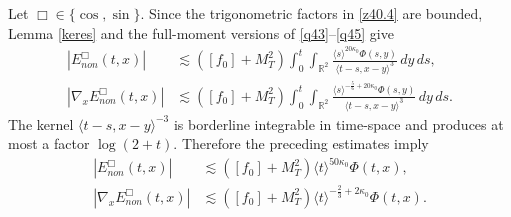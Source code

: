 \documentclass[reqno,11pt]{amsart}
\numberwithin{equation}{section}
\begin{document}
Let $\Box\in\{\cos,\sin\}$. Since the trigonometric factors in
\eqref{z40.4} are bounded, Lemma \ref{keres} and the full-moment versions
of \eqref{q43}--\eqref{q45} give
\begin{align*}
|E^\Box_{non}(t,x)|
&\lesssim([f_0]+M_T^2)
\int_0^t\!\!\int_{\mathbb R^2}
\frac{\langle s\rangle^{20\kappa_0}\Phi(s,y)}
{\langle t-s,x-y\rangle^3}\,dy\,ds,\\
|\nabla_xE^\Box_{non}(t,x)|
&\lesssim([f_0]+M_T^2)
\int_0^t\!\!\int_{\mathbb R^2}
\frac{\langle s\rangle^{-\frac56+20\kappa_0}\Phi(s,y)}
{\langle t-s,x-y\rangle^3}\,dy\,ds.
\end{align*}
The kernel $\langle t-s,x-y\rangle^{-3}$ is borderline integrable in
time-space and produces at most a factor $\log(2+t)$. Therefore the
preceding estimates imply
\begin{align}
|E^\Box_{non}(t,x)|
&\lesssim([f_0]+M_T^2)
\langle t\rangle^{50\kappa_0}\Phi(t,x),
\label{section6-osc-zero}\\
|\nabla_xE^\Box_{non}(t,x)|
&\lesssim([f_0]+M_T^2)
\langle t\rangle^{-\frac23+2\kappa_0}\Phi(t,x).
\label{section6-osc-one}
\end{align}
\end{document}
